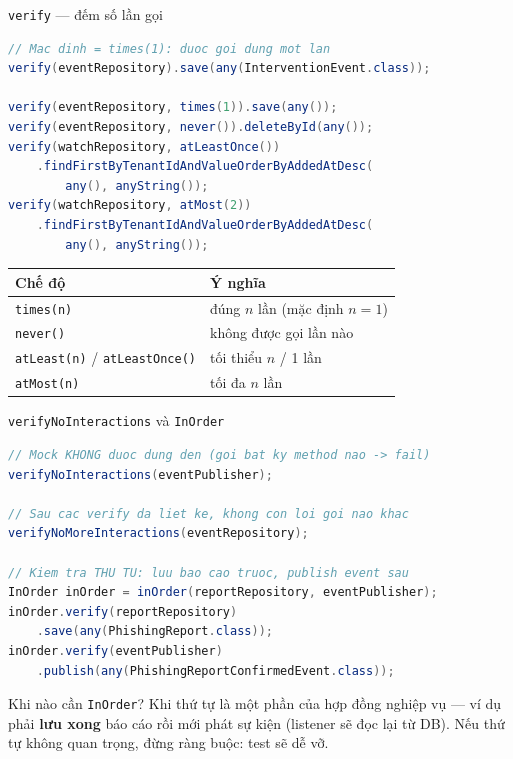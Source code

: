\documentclass[aspectratio=169,12pt]{beamer}
\begin{document}
\begin{frame}[fragile]{\texttt{verify} --- đếm số lần gọi}
\begin{lstlisting}[language=java,basicstyle=\ttfamily\footnotesize]
// Mac dinh = times(1): duoc goi dung mot lan
verify(eventRepository).save(any(InterventionEvent.class));

verify(eventRepository, times(1)).save(any());
verify(eventRepository, never()).deleteById(any());
verify(watchRepository, atLeastOnce())
    .findFirstByTenantIdAndValueOrderByAddedAtDesc(
        any(), anyString());
verify(watchRepository, atMost(2))
    .findFirstByTenantIdAndValueOrderByAddedAtDesc(
        any(), anyString());
\end{lstlisting}

  \begin{center}
  \small
  \begin{tabular}{ll}
    \toprule
    \textbf{Chế độ} & \textbf{Ý nghĩa} \\
    \midrule
    \texttt{times(n)} & đúng $n$ lần (mặc định $n=1$) \\
    \texttt{never()} & không được gọi lần nào \\
    \texttt{atLeast(n)} / \texttt{atLeastOnce()} & tối thiểu $n$ / 1 lần \\
    \texttt{atMost(n)} & tối đa $n$ lần \\
    \bottomrule
  \end{tabular}
  \end{center}
\end{frame}

\begin{frame}[fragile]{\texttt{verifyNoInteractions} và \texttt{InOrder}}
\begin{lstlisting}[language=java,basicstyle=\ttfamily\footnotesize,aboveskip=0pt,belowskip=0pt,framesep=1pt]
// Mock KHONG duoc dung den (goi bat ky method nao -> fail)
verifyNoInteractions(eventPublisher);

// Sau cac verify da liet ke, khong con loi goi nao khac
verifyNoMoreInteractions(eventRepository);

// Kiem tra THU TU: luu bao cao truoc, publish event sau
InOrder inOrder = inOrder(reportRepository, eventPublisher);
inOrder.verify(reportRepository)
    .save(any(PhishingReport.class));
inOrder.verify(eventPublisher)
    .publish(any(PhishingReportConfirmedEvent.class));
\end{lstlisting}

  \begin{block}{Khi nào cần \texttt{InOrder}?}
    Khi thứ tự là một phần của hợp đồng nghiệp vụ --- ví dụ phải
    \textbf{lưu xong} báo cáo rồi mới phát sự kiện (listener sẽ đọc lại từ DB).
    Nếu thứ tự không quan trọng, đừng ràng buộc: test sẽ dễ vỡ.
  \end{block}
\end{frame}
\end{document}
